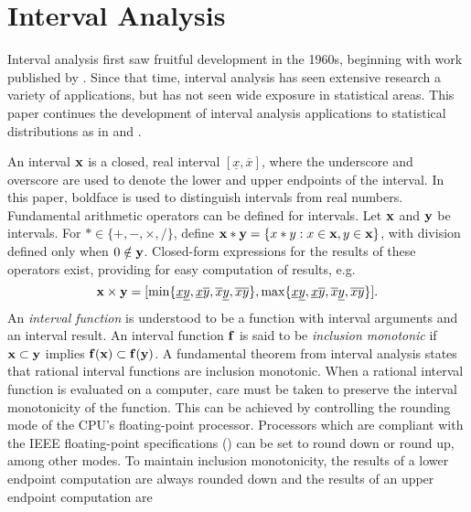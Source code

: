 
\section{Interval Analysis}

Interval analysis first saw fruitful development in the 1960s, beginning
with work published by \cite{Moore66}.  Since that time, interval analysis has
seen extensive research a variety of applications, but has not seen
wide exposure in statistical areas.  
This paper continues the development of interval analysis applications to
statistical distributions as in \cite{WangKennedyJASA} and \cite{WrightChi}.

An interval ${\bf x}$   is a closed, real interval $[\underline x, \overline
x]$, where the underscore and overscore are used to denote the lower and upper
endpoints of the interval.  In this paper, boldface is used to distinguish
intervals from real numbers.  Fundamental arithmetic operators can be defined
for intervals.  Let ${\bf x}$ and ${\bf y}$ be intervals.  For 
$ * \in \{+,-,\times,/ \}$, 
define 
${\bf x} * {\bf y} = \{x*y : x \in {\bf x}, y \in {\bf x} \}$, with division
defined only when $0 \notin {\bf y}$.
Closed-form expressions for the results of these operators exist, providing
for easy
computation of results, e.g. 
$$
{\bf x} \times {\bf y} = 
[\min \{ \underline{x}\underline{y},\underline{x}\overline{y},
      \overline{x}\underline{y}, \overline{x}\overline{y}\},
\max \{ \underline{x}\underline{y},\underline{x}\overline{y},
      \overline{x}\underline{y}, \overline{x}\overline{y}\}].
$$
An {\it interval function} is understood to be a function with interval
arguments and an interval result.
An interval function ${\bf f}$ is said to be {\it inclusion monotonic} if
${\bf x} \subset {\bf y}$ implies ${\bf f}({\bf x}) \subset {\bf f}({\bf y})$.
A fundamental theorem from interval analysis states that rational interval
functions are inclusion monotonic.  
When a rational interval function is evaluated on a computer, care must be
taken to preserve the interval monotonicity of the function.  This can be
achieved by controlling the rounding mode of the CPU's floating-point
processor.  Processors which are compliant with the IEEE floating-point
specifications (\cite{ANSI87}) 
can be set to round down or round up, among other modes.  To
maintain inclusion monotonicity, the results of a lower endpoint computation
are always rounded down and the results of an upper endpoint computation are
